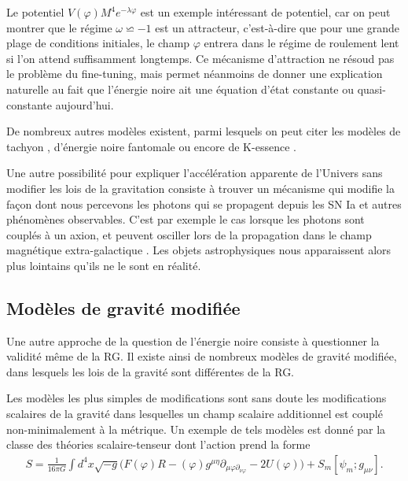 \documentclass[a4paper,12pt]{report}
\theoremstyle{plain}
\theoremstyle{plain}
\begin{document}
Le potentiel $ V( \varphi)M^4 e^{- \lambda \varphi} $ est un exemple int\'eressant de potentiel, car on peut 
montrer que le r\'egime $ \omega \backsimeq -1 $ est un attracteur, c'est-\`a-dire que pour une grande plage de
conditions initiales, le champ $ \varphi $ entrera dans le r\'egime de roulement lent si l'on attend 
suffisamment longtemps. Ce m\'ecanisme d'attraction ne r\'esoud pas le probl\`eme du fine-tuning,
mais permet n\'eanmoins de donner une explication naturelle au fait que l'\'energie noire ait
une \'equation d'\'etat constante ou quasi-constante aujourd'hui.

De nombreux autres mod\`eles existent, parmi lesquels on peut citer les mod\`eles de 
tachyon \cite{241, 242, 243}, d'\'energie noire fantomale \cite{57, 59} ou encore de K-essence \cite{23, 24, 69}.

Une autre possibilit\'e pour expliquer l'acc\'el\'eration apparente de l'Univers sans modifier
les lois de la gravitation consiste \`a trouver un m\'ecanisme qui modifie la fa\c{c}on dont nous
percevons les photons qui se propagent depuis les SN Ia et autres ph\'enom\`enes observables.
C'est par exemple le cas lorsque les photons sont coupl\'es \`a un axion, et peuvent osciller
lors de la propagation dans le champ magn\'etique extra-galactique \cite{78, 99, 102}. Les objets
astrophysiques nous apparaissent alors plus lointains qu'ils ne le sont en r\'ealit\'e.

\subsection{Mod\`eles de gravit\'e modifi\'ee}
Une autre approche de la question de l'\'energie noire consiste \`a questionner la validit\'e
m\^eme de la RG. Il existe ainsi de nombreux mod\`eles de gravit\'e modifi\'ee, dans lesquels les
lois de la gravit\'e sont diff\'erentes de la RG.

Les mod\`eles les plus simples de modifications sont sans doute les modifications scalaires
de la gravit\'e dans lesquelles un champ scalaire additionnel est coupl\'e non-minimalement \`a
la m\'etrique. Un exemple de tels
mod\`eles est donn\'e par la classe des th\'eories scalaire-tenseur \cite{41, 206, 276} dont l'action
prend la forme
\begin{eqnarray}
 S = \frac{1}{16 \pi G} \int d^4x \sqrt{-g} \Biggl(  F(\varphi )R -( \varphi)g^{\mu \eta} \partial_{ \mu \varphi
 \partial_{ \nu \varphi}} - 2U(\varphi)   \Biggr) + S_m [ \psi_m; g_{ \mu \nu}]. \label{gene43}
\end{eqnarray}
\end{document}
